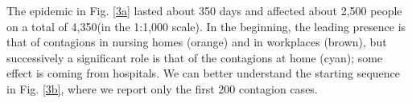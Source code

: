 \documentclass[graybox]{svmult}
\begin{document}
The epidemic in Fig. \ref{3a} lasted about 350 days and affected about 2,500 people on a total of 4,350(in the 1:1,000 scale). In the beginning, the leading presence is that of contagions in nursing homes (orange) and in workplaces (brown), but successively a significant role is that of the contagions at home (cyan); some effect is coming from hospitals. We can better understand the starting sequence in Fig. \ref{3b}, where we report only the first 200 contagion cases.
  

\end{document}
